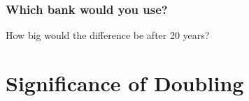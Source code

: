 \documentclass[notheorems
          ]
          {beamer}
\begin{document}
\begin{frame}
 \frametitle {  Which bank would you use?   }
 How big would the difference be after 20 years? 

\end{frame}





%   
%      
% 
%     
%  
% 


\section{Significance of Doubling}
\end{document}
